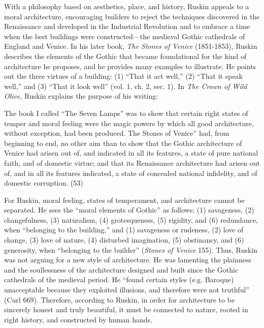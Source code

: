 {\color{black}
With a philosophy based on aesthetics, place, and history, Ruskin
appeals to a moral architecture, encouraging builders to reject the
techniques discovered in the Renaissance and developed in the
Industrial Revolution and to embrace a time when the best buildings
were constructed—the medieval Gothic cathedrals of England and Venice. 
In his later book, \textit{The Stones of Venice }(1851-1853), Ruskin
describes the elements of the Gothic that became foundational for the
kind of architecture he proposes, and he provides many examples to
illustrate.  He points out the three virtues of a building: (1) “That
it act well,” (2) “That it speak well,” and (3) “That it look well”
(vol. 1, ch. 2, sec. 1).  In \textit{The Crown of Wild Olive}, Ruskin
explains the purpose of his writing: }

{\color{black}
The book I called “The Seven Lamps” was to show that certain right
states of temper and moral feeling were the magic powers by which all
good architecture, without exception, had been produced. 
{\textquotesingle}The Stones of Venice” had, from beginning to end, no
other aim than to show that the Gothic architecture of Venice had
arisen out of, and indicated in all its features, a state of pure
national faith, and of domestic virtue; and that its Renaissance
architecture had arisen out of, and in all its features indicated, a
state of concealed national infidelity, and of  domestic corruption. 
(53)}

{\color{black}
For Ruskin, moral feeling, states of temperament, and architecture
cannot be separated.  He sees the “moral elements of Gothic” as
follows: (1) savageness, (2) changefulness, (3) naturalism, (4)
grotesqueness, (5) rigidity, and (6) redundance, when “belonging to the
building,” and (1) savageness or rudeness, (2) love of change, (3) love
of nature, (4) disturbed imagination, (5) obstinancy, and (6)
generosity, when “belonging to the builder” (\textit{Stones of Venice}
155).  Thus, Ruskin was not arguing for a new style of architecture. 
He was lamenting the plainness and the soullessness of the architecture
designed and built since the Gothic cathedrals of the medieval period. 
\textcolor[rgb]{0.13333334,0.13333334,0.13333334}{He “found certain
styles (e.g. Baroque) unacceptable because they exploited illusions,
and therefore were not {\textquotesingle}truthful{\textquotesingle}”
(Curl 669).  Therefore, according to }Ruskin, in order for architecture
to be sincerely honest and truly beautiful, it must be connected to
nature, rooted in right history, and constructed by human hands.  }

